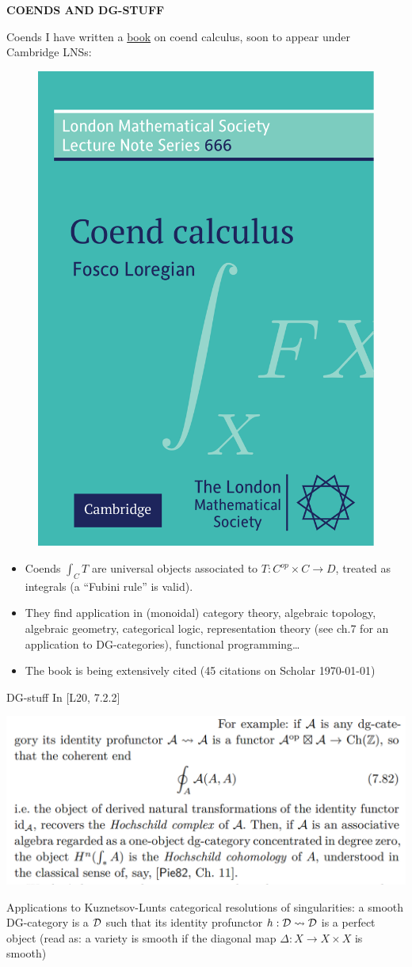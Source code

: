 \documentclass{beamer}
\begin{document}
%
%
%
%
%
%
\begin{frame}
  \Huge\centering \bfseries COENDS AND DG-STUFF
\end{frame}
%
\begin{frame}{Coends}
  I have written a \href{https://arxiv.org/pdf/1501.02503}{book} on \alert{coend calculus}, soon to appear under Cambridge LNSs:
\begin{figure}
  \includegraphics[width=.35\textwidth]{cover-2-.pdf}
\end{figure}
\small
\begin{itemize}
  \item<+-> Coends $\int_C T$ are universal objects associated to $T : C^{op}\times C \to D$, treated as integrals (a ``Fubini rule'' is valid).
  \item<+-> They find application in (monoidal) category theory, algebraic topology, algebraic geometry, categorical logic, representation theory (see ch.7 for an application to \alert{DG-categories}), functional programming\dots
  \item<+-> The book is being extensively cited (45 citations on Scholar \today)
\end{itemize}
\end{frame}
%
%
%
%
\begin{frame}{DG-stuff}
  In [\alert{L20}, 7.2.2]
  \begin{center}
  \includegraphics[width=.75\textwidth]{dg.png}
  \end{center}
  Applications to Kuznetsov-Lunts \alert{categorical resolutions of singularities}: a smooth DG-category is a $\cal D$ such that its identity profunctor $h : {\cal D} \rightsquigarrow \cal D$ is a perfect object (read as: a variety is smooth if the diagonal map $\Delta : X \to X\times X$ is smooth)
\end{frame}
\end{document}
